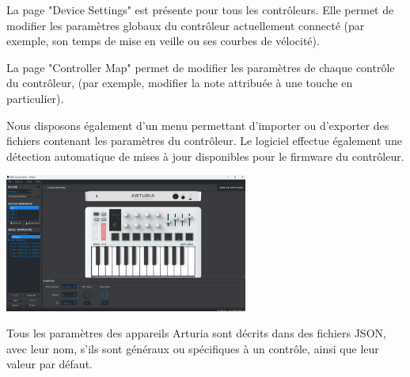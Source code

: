 \documentclass[francais]{rapportPFE}  %
\begin{document}
La page "Device Settings" est présente pour tous les contrôleurs. Elle permet de modifier les paramètres globaux du contrôleur actuellement connecté (par exemple, son temps de mise en veille ou ses courbes de vélocité).

La page "Controller Map" permet de modifier les paramètres de chaque contrôle du contrôleur, (par exemple, modifier la note attribuée à une touche en particulier).

Nous disposons également d'un menu permettant d'importer ou d'exporter des fichiers contenant les paramètres du contrôleur. Le logiciel effectue également une détection automatique de mises à jour disponibles pour le firmware du contrôleur. 

\begin{center}
	\centering
	\includegraphics[width=0.6\textwidth]{graphics/mcc_existant.png}
	\begin{tiny}
	\end{tiny}
	\label{fig}
\end{center}

Tous les paramètres des appareils Arturia sont décrits dans des fichiers JSON, avec leur nom, s'ils sont généraux ou spécifiques à un contrôle, ainsi que leur valeur par défaut. 
\end{document}

